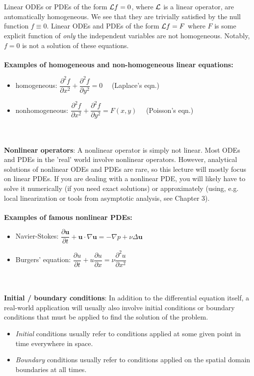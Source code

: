 \\
\\
Linear ODEs or PDEs of the form ${\cal L}f = 0$, where ${\cal L}$ is a linear operator, are automatically homogeneous. We see that they are trivially satisfied by the null function $f \equiv 0$. 
Linear ODEs and PDEs of the form
${\cal L}f = F$ where $F$ is some explicit function of {\it only} the independent variables are not homogeneous. Notably, $f = 0$ is not a solution of these equations.  
\\
\\
{\bf Examples of homogeneous and non-homogeneous linear equations:} 

\begin{itemize}
\item homogeneous: \color{red}$\dfrac{\partial^{2}f}{\partial x^{2}} + \dfrac{\partial^2 f}{\partial y^{2}} = 0 \quad $ (Laplace's eqn.)
\color{black}
\item nonhomogeneous: \color{red}$\dfrac{\partial^{2}f}{\partial x^{2}} + \dfrac{\partial^2 f}{\partial y^{2}} = F(x,y) \quad $ (Poisson's eqn.)
\end{itemize}
\\
\\
{\bf Nonlinear operators}: A nonlinear operator is simply not linear. Most ODEs and PDEs in the 'real' world involve nonlinear operators. However, analytical solutions of nonlinear ODEs and PDEs are rare, so this lecture will mostly focus on linear PDEs. If you are dealing with a nonlinear PDE, you will likely have to solve it numerically (if you need exact solutions) or approximately (using, e.g. local linearization or tools from asymptotic analysis, see Chapter 3).
\\
\\
{\bf Examples of famous nonlinear PDEs:}
\begin{itemize}
\item \color{red} Navier-Stokes: 
$\dfrac{\partial \mathbf{u}}{\partial t} + \mathbf{u} \cdot \nabla \mathbf{u} 
= - \nabla p + \nu \Delta \mathbf{u}$
\color{black}
\item \color{red} Burgers' equation: 
$\dfrac{\partial u}{\partial t} + u \dfrac{\partial u}{\partial x} = \nu \dfrac{\partial^{2}u}{\partial x^{2}}$
\end{itemize}
\\
\\
{\bf Initial / boundary conditions}: In addition to the differential equation itself, a real-world application will usually also involve initial conditions or boundary conditions that must be applied to find the solution of the problem. 
\begin{itemize}
    \item {\it Initial} conditions usually refer to conditions applied at some given point in time everywhere in space. \item {\it Boundary} conditions usually refer to conditions applied on the spatial domain boundaries at all times. 
\end{itemize}

